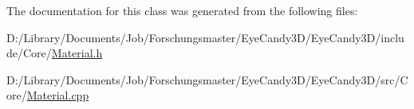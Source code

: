 The documentation for this class was generated from the following files\+:\begin{DoxyCompactItemize}
\item 
D\+:/\+Library/\+Documents/\+Job/\+Forschungsmaster/\+Eye\+Candy3\+D/\+Eye\+Candy3\+D/include/\+Core/\mbox{\hyperlink{_material_8h}{Material.\+h}}\item 
D\+:/\+Library/\+Documents/\+Job/\+Forschungsmaster/\+Eye\+Candy3\+D/\+Eye\+Candy3\+D/src/\+Core/\mbox{\hyperlink{_material_8cpp}{Material.\+cpp}}\end{DoxyCompactItemize}
